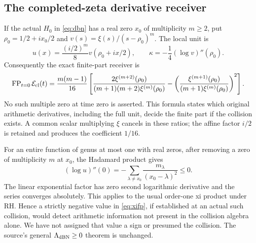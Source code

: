 \documentclass[11pt,a4paper]{article}
\theoremstyle{definition}
\newcommand{\FP}{\operatorname{FP}}\newcommand{\im}{\operatorname{im}}
\begin{document}
\subsection{The completed-zeta derivative receiver}
If the actual $H_0$ in \eqref{eq:dbn} has a real zero $x_0$ of multiplicity $m\ge2$, put
$\rho_0=1/2+ix_0/2$ and $v(s)=\xi(s)/(s-\rho_0)^m$. The local unit is
\[
 u(x)=\frac{(i/2)^m}{8}v(\rho_0+ix/2),
 \qquad \kappa=-\frac14(\log v)''(\rho_0).
\]
Consequently the exact finite-part receiver is
\begin{equation}\label{eq:xifp}
 \FP_{t=0}\mathcal E_{\rm cl}(t)
 =\frac{m(m-1)}{16}
 \left[
 \frac{2\xi^{(m+2)}(\rho_0)}{(m+1)(m+2)\xi^{(m)}(\rho_0)}
 -\left(\frac{\xi^{(m+1)}(\rho_0)}{(m+1)\xi^{(m)}(\rho_0)}\right)^2
 \right].
\end{equation}
No such multiple zero at time zero is asserted. This formula states which original arithmetic derivatives, including the full unit, decide the finite part if the collision exists. A common scalar multiplying $\xi$ cancels in these ratios; the affine factor $i/2$ is retained and produces the coefficient $1/16$.

For an entire function of genus at most one with real zeros, after removing a zero of multiplicity $m$ at $x_0$, the Hadamard product gives
\[
 (\log u)''(0)=-\sum_{\lambda\ne x_0}
 \frac{m_\lambda}{(x_0-\lambda)^2}\le0.
\]
The linear exponential factor has zero second logarithmic derivative and the series converges absolutely. This applies to the usual order-one xi product under RH. Hence a strictly negative value in \eqref{eq:xifp}, if established at an actual such collision, would detect arithmetic information not present in the collision algebra alone. We have not assigned that value a sign or presumed the collision. The source's general $\Lambda_{\rm dBN}\ge0$ theorem is unchanged.
\end{document}
